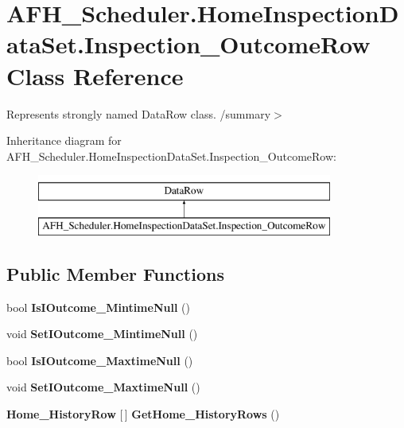 \section{A\+F\+H\+\_\+\+Scheduler.\+Home\+Inspection\+Data\+Set.\+Inspection\+\_\+\+Outcome\+Row Class Reference}
\label{class_a_f_h___scheduler_1_1_home_inspection_data_set_1_1_inspection___outcome_row}


Represents strongly named Data\+Row class. /summary$>$  


Inheritance diagram for A\+F\+H\+\_\+\+Scheduler.\+Home\+Inspection\+Data\+Set.\+Inspection\+\_\+\+Outcome\+Row\+:\begin{figure}[H]
\begin{center}
\leavevmode
\includegraphics[height=2.000000cm]{class_a_f_h___scheduler_1_1_home_inspection_data_set_1_1_inspection___outcome_row}
\end{center}
\end{figure}
\subsection*{Public Member Functions}
\begin{DoxyCompactItemize}
\item 
\mbox{\label{class_a_f_h___scheduler_1_1_home_inspection_data_set_1_1_inspection___outcome_row_aba9be554e975ffcea36ef3877830d81e}} 
bool {\bfseries Is\+I\+Outcome\+\_\+\+Mintime\+Null} ()
\item 
\mbox{\label{class_a_f_h___scheduler_1_1_home_inspection_data_set_1_1_inspection___outcome_row_a0dace17c7f17a1336252c6437908b668}} 
void {\bfseries Set\+I\+Outcome\+\_\+\+Mintime\+Null} ()
\item 
\mbox{\label{class_a_f_h___scheduler_1_1_home_inspection_data_set_1_1_inspection___outcome_row_a816003239d485459619c3412c14ab7d3}} 
bool {\bfseries Is\+I\+Outcome\+\_\+\+Maxtime\+Null} ()
\item 
\mbox{\label{class_a_f_h___scheduler_1_1_home_inspection_data_set_1_1_inspection___outcome_row_afbd7e93d7685ce354fdd41a133133039}} 
void {\bfseries Set\+I\+Outcome\+\_\+\+Maxtime\+Null} ()
\item 
\mbox{\label{class_a_f_h___scheduler_1_1_home_inspection_data_set_1_1_inspection___outcome_row_a8e5fb2723f6175b7764e924ecb705272}} 
\textbf{ Home\+\_\+\+History\+Row} [$\,$] {\bfseries Get\+Home\+\_\+\+History\+Rows} ()
\end{DoxyCompactItemize}
